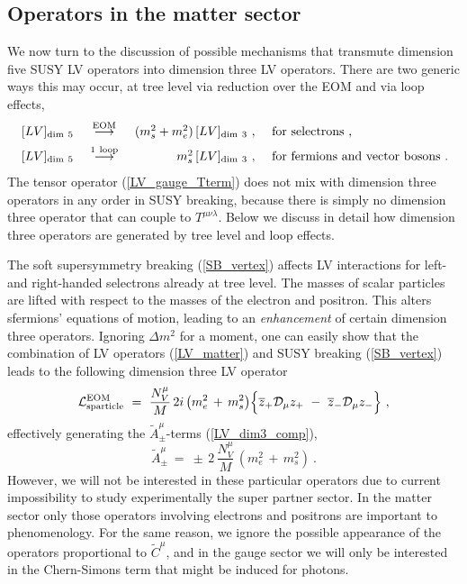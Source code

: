 \documentclass[12pt]{revtex4}
\begin{document}
\subsection{Operators in the matter sector}


We now turn to the discussion of possible mechanisms that transmute
dimension five SUSY LV operators 
into dimension three LV operators. There are two generic ways this 
may occur, at tree level via reduction over the EOM and via loop
effects,   
\begin{equation}
\begin{array}{l c r l} 
\, [LV]_{\rm dim~5} & ~\stackrel{\mathrm {EOM}}{\longrightarrow}~ &
  (m_{s}^2 + m_e^2)\, [LV]_{\rm dim~3}~,~ &{\rm for~selectrons}~, 
\\[1ex] \,
[LV]_{\rm dim~5} &~ \stackrel{\mathrm {1\ loop}}{\longrightarrow}~ &
  m_{s}^2\, [LV]_{\rm dim~3}~,~ & {\rm for~fermions ~and ~vector~bosons}
~.
\end{array}
\nonumber
\end{equation}
%
The tensor operator (\ref{LV_gauge_Tterm}) does not mix with dimension
three operators in any order in SUSY breaking, because there is simply
no dimension three operator that can couple to
$T^{\mu\nu\lambda}$. Below we discuss in detail how dimension
three operators are generated by tree level and loop effects. 


The soft supersymmetry breaking (\ref{SB_vertex}) affects LV
interactions for left- and right-handed selectrons already at tree
level. The masses of scalar particles are lifted with respect to the
masses of the electron and positron. This alters sfermions' equations
of motion, leading to an {\em enhancement} of certain dimension three
operators. Ignoring $\Delta m^2$ for a moment, one can easily show
that the combination of LV operators (\ref{LV_matter}) and SUSY
breaking (\ref{SB_vertex}) leads to the following dimension three LV
operator 
%
\begin{equation}
  \mathcal{L}_{\rm sparticle}^{\rm EOM} ~=~  
\frac{N_V^\mu}{M}\, 2 i\, 
\big(
m_e^2 \,+\,  m_s^2
\big)
\Bigl\{ 
\overline{z}_+ \mathcal{D}_\mu z_+ 
~-~
\overline{z}_- \mathcal{D}_\mu z_- 
\Bigr\}~,  
\end{equation}
%
effectively generating the $ \widetilde{A}^\mu_\pm $-terms
%
(\ref{LV_dim3_comp}), 
 \begin{equation}
\widetilde{A}_\pm^\mu ~=~  
\pm\, 2\, \frac{N_V^\mu}{ M }   \, 
(m_e^2 \, +\,  m_s^2)~.
\end{equation}
%
However, we will not be interested in these particular operators due
to current impossibility to study experimentally  the super partner
sector. In the matter sector only those operators involving electrons
and positrons are important to phenomenology.  
For the same reason, we ignore the possible appearance of the
operators proportional to $ \widetilde{C}^\mu $, and in the gauge
sector we will only be interested in the Chern-Simons term that might
be induced for photons. 
\end{document}
